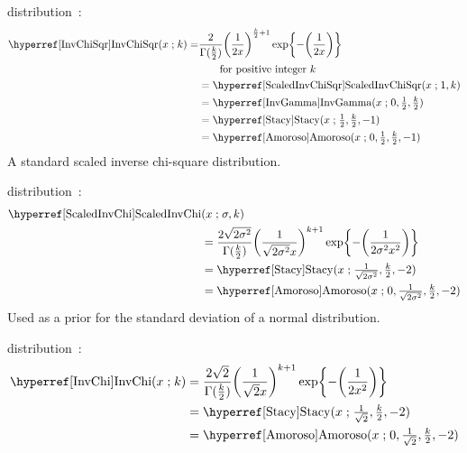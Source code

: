  distribution~\cite{Gelman2004}: 
%
\begin{align}
\label{InvChiSqr}
\opr{InvChiSqr}(x \given k) 
=& \frac{2}{\Gamma(\tfrac{k}{2}) } \Left(\frac{1}{2x}\Right)^{\frac{k}{2}+1} \exp\Left\{-\Left( \frac{1}{2x}  \Right)\Right\}
\checked  \\
&\qquad  \text{for positive integer } k \notag \\
& = \opr{ScaledInvChiSqr}(x\given 1,k)\notag \checked \\
&=  \opr{InvGamma}(x\given 0, \tfrac{1}{2}, \tfrac{k}{2}) \notag \checked \\
&=  \opr{Stacy}(x\given \tfrac{1}{2}, \tfrac{k}{2},-1) \notag  \checked\\
&=  \opr{Amoroso}(x\given  0, \tfrac{1}{2}, \tfrac{k}{2}, -1)  \checked\notag 
\end{align}
A standard scaled inverse chi-square distribution.



 distribution~\cite{Lee2012}:
\begin{align}
\label{ScaledInvChi}
 \opr{ScaledInvChi}&(x \given \sigma, k) 
\\ \notag
&= \frac{2 \sqrt{2 \sigma ^2} }{ \Gamma(\tfrac{k}{2})} { \Left(\frac{1}{\sqrt{2 \sigma^2} x}\Right)}^{k+1} \exp\Left\{-\Left(\frac{1}{2 \sigma^2 x^2}  \Right)\Right\} \checked
\\
&=  \opr{Stacy}(x\given \tfrac{1}{\sqrt{2 \sigma^2}}, \tfrac{k}{2}, -2)  \notag \checked \\
&=  \opr{Amoroso}(x\given  0, \tfrac{1}{\sqrt{2 \sigma^2}}, \tfrac{k}{2}, -2) \notag  \checked
\end{align}
Used as a prior for the standard deviation of a normal distribution.

 distribution~\cite{Lee2012}: 
\begin{align}
\label{InvChi}
\opr{InvChi}(x \given k) 
&= \frac{2\sqrt{2} }{ \Gamma(\tfrac{k}{2})} { \Left(\frac{1}{\sqrt{2} x}\Right)}^{k+1} \exp\Left\{-\Left(\frac{1}{2 x^2}  \Right)\Right\}
\checked
\\
&=  \opr{Stacy}(x\given  \tfrac{1}{\sqrt{2}}, \tfrac{k}{2}, -2)  \notag \checked \\
&=  \opr{Amoroso}(x\given  0, \tfrac{1}{\sqrt{2}} , \tfrac{k}{2}, -2) \notag  \checked
\end{align}


